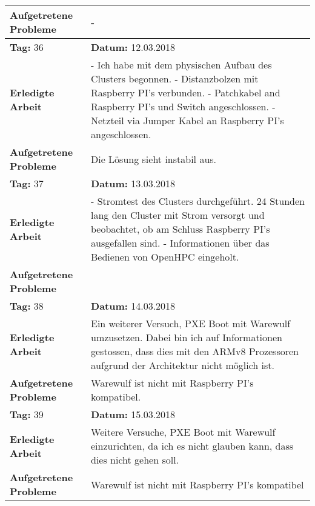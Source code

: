 \begin{longtable}{|p{5cm}|p{5cm}p{6cm}|}
\textbf{Aufgetretene Probleme}\newline \newline \newline \newline & \multicolumn{2}{p{11cm}|}{-} \\ \hline
\rowcolor{heading}\textbf{Tag:} 36 & \textbf{Datum:} 12.03.2018 & \\ \hline
\textbf{Erledigte Arbeit} & \multicolumn{2}{p{11cm}|}{- Ich habe mit dem physischen Aufbau des Clusters begonnen. \newline
- Distanzbolzen mit Raspberry PI's verbunden. \newline
- Patchkabel and Raspberry PI's und Switch angeschlossen. \newline
- Netzteil via Jumper Kabel an Raspberry PI's angeschlossen.} \\ \hline
\textbf{Aufgetretene Probleme} & \multicolumn{2}{p{11cm}|}{Die Lösung sieht instabil aus.} \\ \hline
\rowcolor{heading}\textbf{Tag:} 37 & \textbf{Datum:} 13.03.2018 & \\ \hline
\textbf{Erledigte Arbeit} & \multicolumn{2}{p{11cm}|}{- Stromtest des Clusters durchgeführt. 24 Stunden lang den Cluster mit Strom versorgt und beobachtet, ob am Schluss Raspberry PI's ausgefallen sind. \newline
- Informationen über das Bedienen von OpenHPC eingeholt.} \\ \hline
\textbf{Aufgetretene Probleme} & \multicolumn{2}{p{11cm}|}{} \\ \hline
\rowcolor{heading}\textbf{Tag:} 38 & \textbf{Datum:} 14.03.2018 & \\ \hline
\textbf{Erledigte Arbeit} & \multicolumn{2}{p{11cm}|}{Ein weiterer Versuch, PXE Boot mit Warewulf umzusetzen. Dabei bin ich auf Informationen gestossen, dass dies mit den ARMv8 Prozessoren aufgrund der Architektur nicht möglich ist.} \\ \hline
\textbf{Aufgetretene Probleme} & \multicolumn{2}{p{11cm}|}{Warewulf ist nicht mit Raspberry PI's kompatibel.} \\ \hline
\rowcolor{heading}\textbf{Tag:} 39 & \textbf{Datum:} 15.03.2018 & \\ \hline
\textbf{Erledigte Arbeit} & \multicolumn{2}{p{11cm}|}{Weitere Versuche, PXE Boot mit Warewulf einzurichten, da ich es nicht glauben kann, dass dies nicht gehen soll.} \\ \hline
\textbf{Aufgetretene Probleme} & \multicolumn{2}{p{11cm}|}{Warewulf ist nicht mit Raspberry PI's kompatibel} \\ \hline

\end{longtable}
